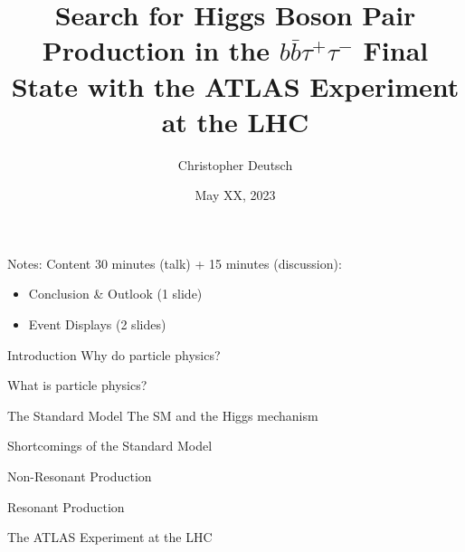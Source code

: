 \documentclass[11pt, xcolor={dvipsnames}, aspectratio=169]{beamer}
\author{Christopher Deutsch}
\institute{University of Bonn}
\date{May XX, 2023}
\title{Search for Higgs Boson Pair Production in the $b\bar{b}\tau^+\tau^-$
  Final State with the ATLAS Experiment at the LHC}
\begin{document}
\maketitle

\begin{frame}{Notes: Content}
  30 minutes (talk) + 15 minutes (discussion):
  \begin{itemize}

  \item Conclusion \& Outlook (1 slide)

  \item Event Displays (2 slides)

  \end{itemize}
\end{frame}


\begin{frame}{Introduction}
  Why do particle physics?

  What is particle physics?
\end{frame}


\begin{frame}{The Standard Model}
  The SM and the Higgs mechanism
\end{frame}


\begin{frame}{Shortcomings of the Standard Model}
\end{frame}


\begin{frame}{Non-Resonant \HH Production}
\end{frame}


\begin{frame}{Resonant \HH Production}
\end{frame}


\begin{frame}{The ATLAS Experiment at the LHC}
\end{frame}
\end{document}
